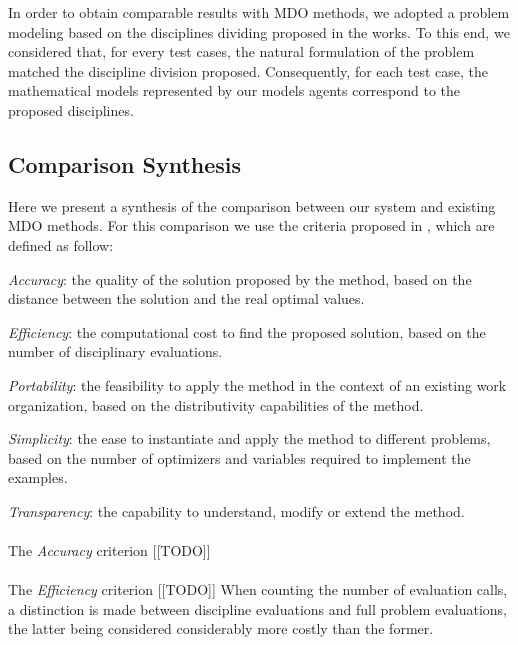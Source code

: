 In order to obtain comparable results with MDO methods, we adopted a problem modeling based on the disciplines dividing proposed in the works. To this end, we considered that, for every test cases, the natural formulation of the problem matched the discipline division proposed. Consequently, for each test case, the mathematical models represented by our models agents correspond to the proposed disciplines.

\subsection{Comparison Synthesis}
 
 Here we present a synthesis of the comparison between our system and existing MDO methods. For this comparison we use the criteria proposed in \cite{perez2004evaluation}, which are defined as follow:
 \begin{compactitem}
 \item \emph{Accuracy}: the quality of the solution proposed by the method, based on the distance between the solution and the real optimal values.
 \item \emph{Efficiency}: the computational cost to find the proposed solution, based on the number of disciplinary evaluations.
 \item \emph{Portability}: the feasibility to apply the method in the context of an existing work organization, based on the distributivity capabilities of the method.
 \item \emph{Simplicity}: the ease to instantiate and apply the method to different problems, based on the number of optimizers and variables required to implement the examples.
 \item \emph{Transparency}: the capability to understand, modify or extend the method.
 \end{compactitem}
 
 \paragraph*{}
 The \emph{Accuracy} criterion [[TODO]]
 
 \paragraph*{}
 The \emph{Efficiency} criterion [[TODO]]
When counting the number of evaluation calls, a distinction is made between discipline evaluations and full problem evaluations, the latter being considered considerably more costly than the former.

